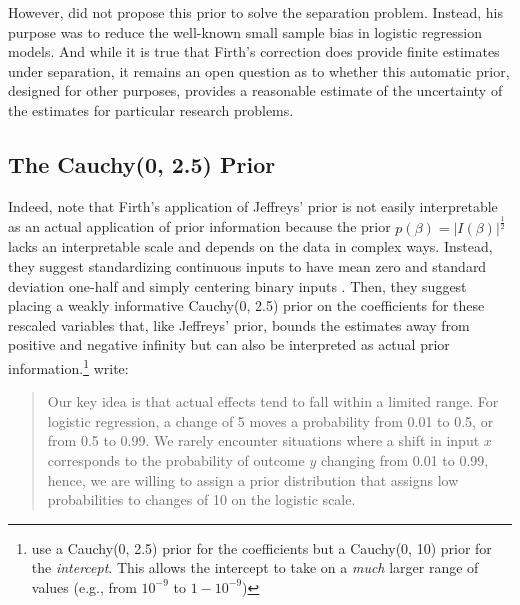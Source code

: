 \documentclass[12pt]{article}
\begin{document}
However, \cite{Firth1993} did not propose this prior to solve the separation problem. Instead, his purpose was to reduce the well-known small sample bias in logistic regression models. And while it is true that Firth's correction does provide finite estimates under separation, it remains an open question as to whether this automatic prior, designed for other purposes, provides a reasonable estimate of the uncertainty of the estimates for particular research problems.

\subsection*{The Cauchy(0, 2.5) Prior}

Indeed, \cite{Gelmanetal2008} note that Firth's application of Jeffreys' prior is not easily interpretable as an actual application of prior information because the prior $p(\beta) = |I(\beta)|^\frac{1}{2}$ lacks an interpretable scale and depends on the data in complex ways. Instead, they suggest standardizing continuous inputs to have mean zero and standard deviation one-half and simply centering binary inputs \citep{Gelman2008}. Then, they suggest placing a weakly informative Cauchy(0, 2.5) prior on the coefficients for these rescaled variables that, like Jeffreys' prior, bounds the estimates away from positive and negative infinity but can also be interpreted as actual prior information.\footnote{\cite{Gelmanetal2008} use a Cauchy(0, 2.5) prior for the coefficients but a Cauchy(0, 10) prior for the \emph{intercept}. This allows the intercept to take on a \emph{much} larger range of values (e.g., from $10^{-9}$ to $1 - 10^{-9}$)} \citet[p. 1363]{Gelmanetal2008} write:
\begin{quote}
Our key idea is that actual effects tend to fall within a limited range. For logistic regression, a change of 5 moves a probability from 0.01 to 0.5, or from 0.5 to 0.99. We rarely encounter situations where a shift in input $x$ corresponds to the probability of outcome $y$ changing from 0.01 to 0.99, hence, we are willing to assign a prior distribution that assigns low probabilities to changes of 10 on the logistic scale.
\end{quote}

%
\end{document}
